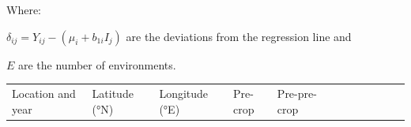 \documentclass[
  british,
  a4paper,
  DIV=11,
  numbers=noendperiod]{scrreprt}
\begin{document}
Where:

\(\delta_{ij} = Y_{ij} - (\mu_i + b_{1i}I_j)\) are the deviations from
the regression line and

\(E\) are the number of environments.

\begin{table}

\caption{\label{tbl-sites}}


\end{table}%

\begin{longtable}[]{@{}
  >{\raggedright\arraybackslash}p{}
  >{\raggedright\arraybackslash}p{}
  >{\raggedright\arraybackslash}p{}
  >{\raggedright\arraybackslash}p{}
  >{\raggedright\arraybackslash}p{}
  >{\raggedright\arraybackslash}p{}
  >{\raggedright\arraybackslash}p{}
  >{\raggedright\arraybackslash}p{}
  >{\raggedright\arraybackslash}p{}
  >{\raggedright\arraybackslash}p{}
  >{\raggedright\arraybackslash}p{}
  >{\raggedright\arraybackslash}p{}@{}}
\toprule\noalign{}
\begin{minipage}[b]{\linewidth}\raggedright
Location and year
\end{minipage} & \begin{minipage}[b]{\linewidth}\raggedright
Latitude (°N)
\end{minipage} & \begin{minipage}[b]{\linewidth}\raggedright
Longitude (°E)
\end{minipage} & \begin{minipage}[b]{\linewidth}\raggedright
Pre-crop
\end{minipage} & \begin{minipage}[b]{\linewidth}\raggedright
Pre-pre-crop
\end{minipage} & \begin{minipage}[b]{\linewidth}\raggedright

\end{minipage}
\end{longtable}
\end{document}
